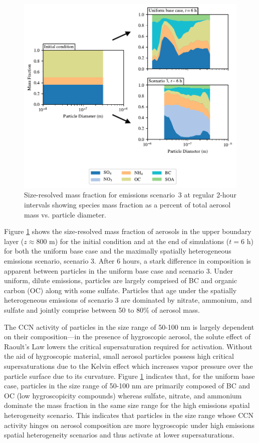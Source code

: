 \documentclass[journal abbreviation, manuscript]{copernicus}
\begin{document}
\begin{figure}[!h]
	\centering
	\includegraphics[]{figures/speciated-mass-frac-three-panel-z40.pdf}
	\caption{Size-resolved mass fraction for emissions scenario~3 at regular 2-hour intervals showing species mass fraction as a percent of total aerosol mass vs. particle diameter.}
	\label{fig:speciated-mass-frac}
\end{figure} 

Figure \ref{fig:speciated-mass-frac} shows the size-resolved mass fraction of aerosols in the upper boundary layer ($z\approx 800$ m) for the initial condition and at the end of simulations ($t=6$ h) for both the uniform base case and the maximally spatially heterogeneous emissions scenario, scenario 3. After 6 hours, a stark difference in composition is apparent between particles in the uniform base case and scenario 3. Under uniform, dilute emissions, particles are largely comprised of BC and organic carbon (OC) along with some sulfate. Particles that age under the spatially heterogeneous emissions of scenario 3 are dominated by nitrate, ammonium, and sulfate and jointly comprise between 50 to 80\% of aerosol mass. 

The CCN activity of particles in the size range of 50-100 nm is largely dependent on their composition---in the presence of hygroscopic aerosol, the solute effect of Raoult's Law lowers the critical supersaturation required for activation. Without the aid of hygroscopic material, small aerosol particles possess high critical supersaturations due to the Kelvin effect which increases vapor pressure over the particle surface due to its curvature. Figure \ref{fig:speciated-mass-frac} indicates that, for the uniform base case, particles in the size range of 50-100 nm are primarily composed of BC and OC (low hygroscopicity compounds) whereas sulfate, nitrate, and ammonium dominate the mass fraction in the same size range for the high emissions spatial heterogeneity scenario. This indicates that particles in the size range whose CCN activity hinges on aerosol composition are more hygroscopic under high emissions spatial heterogeneity scenarios and thus activate at lower supersaturations.
\end{document}
